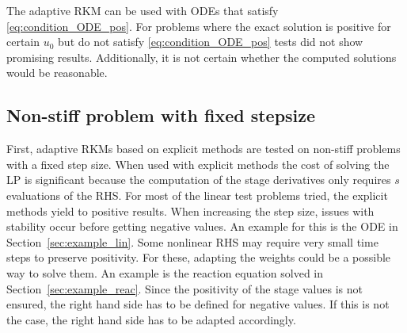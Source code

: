 \documentclass[a4paper]{article}
\numberwithin{equation}{section}
\theoremstyle{plain}
\theoremstyle{definition}
\numberwithin{theorem}{section}
\newcommand{\1}{\mathbbm{1}}
\begin{document}
The adaptive RKM can be used with ODEs that satisfy \eqref{eq:condition_ODE_pos}.
For problems where the exact solution is positive for certain $u_0$ but do not satisfy \eqref{eq:condition_ODE_pos} tests did not show promising results. Additionally, it is not certain whether the computed solutions would be reasonable.


\subsection{Non-stiff problem with fixed stepsize}\label{sec:Ex_expl}
First, adaptive RKMs based on explicit methods are tested on non-stiff problems with a fixed step size.
When used with explicit methods the cost of solving the LP is significant because the computation of the stage derivatives only requires $s$ evaluations of the RHS.
For most of the linear test problems tried, the explicit methods yield to positive results.
When increasing the step size, issues with stability occur before getting negative values.
An example for this is the ODE in Section~\ref{sec:example_lin}.
Some nonlinear RHS may require very small time steps to preserve positivity.
For these, adapting the weights could be a possible way to solve them.
An example is the reaction equation solved in Section~\ref{sec:example_reac}.
Since the positivity of the stage values is not ensured, the right hand side has to be defined for negative values. If this is not the case, the right hand side has to be adapted accordingly.
\end{document}
